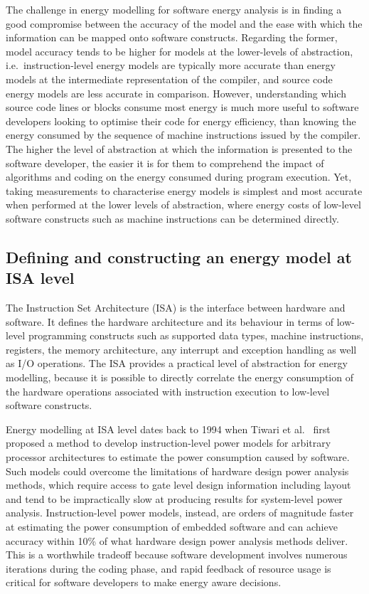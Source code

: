 \documentclass[oneside]{book}
\begin{document}
The challenge in energy modelling for software energy analysis is in finding a good compromise between the accuracy of the model and the ease with which the information can be mapped onto software constructs. Regarding the former, model accuracy tends to be higher for models at the lower-levels of abstraction, i.e.\ instruction-level energy models are typically more accurate than energy models at the intermediate representation of the compiler, and source code energy models are less accurate in comparison. 
%
However, understanding which source code lines or blocks consume most energy is much more useful to software developers looking to optimise their code for energy efficiency, than knowing the energy consumed by the sequence of machine instructions issued by the compiler. The higher the level of abstraction at which the information is presented to the software developer, the easier it is for them to comprehend the impact of algorithms and coding on the energy consumed during program execution. Yet, taking measurements to characterise energy models is simplest and most accurate when performed at the lower levels of abstraction, where energy costs of low-level software constructs such as machine instructions can be determined directly.



\subsection{Defining and constructing an energy model at ISA level}\label{subsec:isa}

The Instruction Set Architecture (ISA) is the interface between hardware and
software. 
%
It defines the hardware architecture and its behaviour in terms of low-level
programming constructs such as supported data types, machine instructions,
registers, the memory architecture, any interrupt and exception handling as
well as I/O operations.
%
The ISA provides a practical level of abstraction for energy modelling, because
it is possible to directly correlate the energy consumption of the hardware
operations associated with instruction execution to low-level software
constructs.

Energy modelling at ISA level dates back to 1994 when Tiwari et
al.~\cite{Tiwari-embedded-1994} first proposed a
%
method to develop instruction-level power models for arbitrary
processor architectures to estimate the power consumption caused by software.
%
Such models could overcome the limitations of hardware design power analysis
methods, which require access to gate level design information including layout
and tend to be impractically slow at producing results for system-level power
analysis. Instruction-level power models, instead, are orders of magnitude
faster at estimating the power consumption of embedded software and can achieve
accuracy within 10\% of what hardware design power analysis methods deliver.
This is a worthwhile tradeoff because software development involves numerous
iterations during the coding phase, and rapid feedback of resource usage is
critical for software developers to make energy aware decisions.
\end{document}

